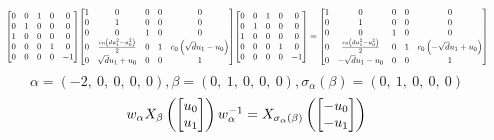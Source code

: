 \documentclass[11pt]{article}
\theoremstyle{definition}
\begin{document}
\[
\scaletoalign{\textwidth}{{\left[\begin{matrix}0 & 0 & 1 & 0 & 0\\0 & 1 & 0 & 0 & 0\\1 & 0 & 0 & 0 & 0\\0 & 0 & 0 & 1 & 0\\0 & 0 & 0 & 0 & -1\end{matrix}\right]} {\left[\begin{matrix}1 & 0 & 0 & 0 & 0\\0 & 1 & 0 & 0 & 0\\0 & 0 & 1 & 0 & 0\\0 & \frac{c_{0} \left(d u_{1}^{2} - u_{0}^{2}\right)}{2} & 0 & 1 & c_{0} \left(\sqrt{d} u_{1} - u_{0}\right)\\0 & \sqrt{d} u_{1} + u_{0} & 0 & 0 & 1\end{matrix}\right]} {\left[\begin{matrix}0 & 0 & 1 & 0 & 0\\0 & 1 & 0 & 0 & 0\\1 & 0 & 0 & 0 & 0\\0 & 0 & 0 & 1 & 0\\0 & 0 & 0 & 0 & -1\end{matrix}\right]} = {\left[\begin{matrix}1 & 0 & 0 & 0 & 0\\0 & 1 & 0 & 0 & 0\\0 & 0 & 1 & 0 & 0\\0 & \frac{c_{0} \left(d u_{1}^{2} - u_{0}^{2}\right)}{2} & 0 & 1 & c_{0} \left(- \sqrt{d} u_{1} + u_{0}\right)\\0 & - \sqrt{d} u_{1} - u_{0} & 0 & 0 & 1\end{matrix}\right]}}
\]
\[
\alpha = \left( -2, \  0, \  0, \  0, \  0\right), \beta = \left( 0, \  1, \  0, \  0, \  0\right), \sigma_{\alpha}(\beta) = \left( 0, \  1, \  0, \  0, \  0\right)
\]
\[
\scaletoalign{\textwidth}{w_{\alpha} X_{\beta}\left(\left[\begin{matrix}u_{0}\\u_{1}\end{matrix}\right]\right) w_{\alpha}^{-1} = X_{\sigma_{\alpha}\left(\beta\right)}\left(\left[\begin{matrix}- u_{0}\\- u_{1}\end{matrix}\right]\right)}
\]
\end{document}
